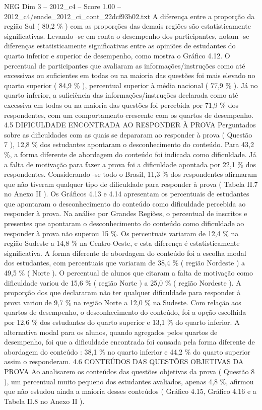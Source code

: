\begin{textsample}{NEG Dim 3 – 2012\_c4 – Score 1.00 – 2012\_c4/enade\_2012\_ci\_cont\_22dcf93b02.txt}
A diferença entre a proporção da região Sul ( 80,2 \% ) com as proporções das demais regiões são estatisticamente significativas.
Levando -se em conta o desempenho dos participantes, notam -se diferenças estatisticamente significativas entre as opiniões de estudantes do quarto inferior e superior de desempenho, como mostra o Gráfico 4.12.
O percentual de participantes que avaliaram as informações/instruções como até excessivas ou suficientes em todas ou na maioria das questões foi mais elevado no quarto superior ( 84,9 \% ), percentual superior à média nacional ( 77,9 \% ).
Já no quarto inferior, a suficiência das informações/instruções declarada como até excessiva em todas ou na maioria das questões foi percebida por 71,9 \% dos respondentes, com um comportamento crescente com os quartos de desempenho. 4.5 DIFICULDADE ENCONTRADA AO RESPONDER À PROVA Perguntados sobre as dificuldades com as quais se depararam ao responder à prova ( Questão 7 ), 12,8 \% dos estudantes apontaram o desconhecimento do conteúdo.
Para 43,2 \%, a forma diferente de abordagem do conteúdo foi indicada como dificuldade.
Já a falta de motivação para fazer a prova foi a dificuldade apontada por 22,1 \% dos respondentes.
Considerando -se todo o Brasil, 11,3 \% dos respondentes afirmaram que não tiveram qualquer tipo de dificuldade para responder à prova ( Tabela II.7 no Anexo II ).
Os Gráficos 4.13 e 4.14 apresentam os percentuais de estudantes que apontaram o desconhecimento do conteúdo como dificuldade percebida ao responder à prova.
Na análise por Grandes Regiões, o percentual de inscritos e presentes que apontaram o desconhecimento do conteúdo como dificuldade ao responder à prova não superou 15 \%.
Os percentuais variaram de 12,4 \% na região Sudeste a 14,8 \% na Centro-Oeste, e esta diferença é estatisticamente significativa.
A forma diferente de abordagem do conteúdo foi a escolha modal dos estudantes, com percentuais que variaram de 38,4 \% ( região Nordeste ) a 49,5 \% ( Norte ).
O percentual de alunos que citaram a falta de motivação como dificuldade variou de 15,6 \% ( região Norte ) a 25,0 \% ( região Nordeste ).
A proporção dos que declararam não ter qualquer dificuldade para responder à prova variou de 9,7 \% na região Norte a 12,0 \% na Sudeste.
Com relação aos quartos de desempenho, o desconhecimento do conteúdo, foi a opção escolhida por 12,6 \% dos estudantes do quarto superior e 13,1 \% do quarto inferior.
A alternativa modal para os alunos, quando agregados pelos quartos de desempenho, foi que a dificuldade encontrada foi causada pela forma diferente de abordagem do conteúdo : 38,1 \% no quarto inferior e 44,2 \% do quarto superior assim o responderam. 4.6 CONTEÚDOS DAS QUESTÕES OBJETIVAS DA PROVA Ao analisarem os conteúdos das questões objetivas da prova ( Questão 8 ), um percentual muito pequeno dos estudantes avaliados, apenas 4,8 \%, afirmou que não estudou ainda a maioria desses conteúdos ( Gráfico 4.15, Gráfico 4.16 e a Tabela II.8 no Anexo II ).

\end{textsample}
